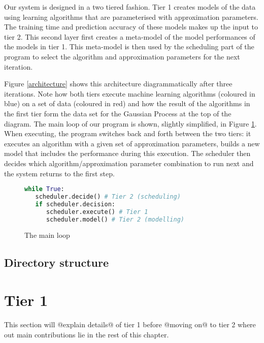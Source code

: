 \documentclass[a4paper,12pt,twoside,openright]{report}
\begin{document}
Our system is designed in a two tiered fashion. Tier 1 creates models of the data using learning algorithms that are parameterised with approximation parameters. The training time and prediction accuracy of these models makes up the input to tier 2. This second layer first creates a meta-model of the model performances of the models in tier 1. This meta-model is then used by the scheduling part of the program to select the algorithm and approximation parameters for the next iteration. 

Figure \ref{architecture} shows this architecture diagrammatically after three iterations. Note how both tiers execute machine learning algorithms (coloured in blue) on a set of data (coloured in red) and how the result of the algorithms in the first tier form the data set for the Gaussian Process at the top of the diagram. The main loop of our program is shown, slightly simplified, in Figure \ref{mainloop}. When executing, the program switches back and forth between the two tiers: it executes an algorithm with a given set of approximation parameters, builds a new model that includes the performance during this execution. The scheduler then decides which algorithm/approximation parameter combination to run next and the system returns to the first step.

\begin{figure}[ht]
\begin{lstlisting}[language=Python]
while True:
   scheduler.decide() # Tier 2 (scheduling)
   if scheduler.decision:
      scheduler.execute() # Tier 1
      scheduler.model() # Tier 2 (modelling)
\end{lstlisting}
\caption{The main loop}
\label{mainloop}
\end{figure}


\subsection{Directory structure}


\section{Tier 1}
This section will @explain details@ of tier 1 before @moving on@ to tier 2 where out main contributions lie in the rest of this chapter.
\end{document}
